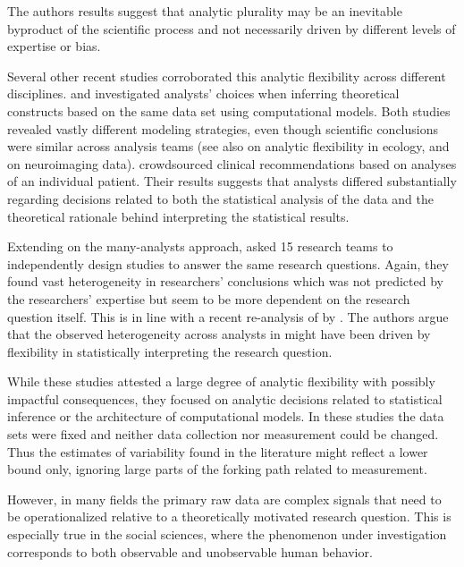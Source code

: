 \documentclass[Review,times,sageh]{sagej}
\begin{document}
The authors results suggest that analytic plurality may be an inevitable byproduct of the scientific process and not necessarily driven by different levels of expertise or bias.

Several other recent studies corroborated this analytic flexibility across different disciplines.
\citet{dutilh2019} and \citet{starns2019assessing} investigated analysts' choices when inferring theoretical constructs based on the same data set using computational models.
Both studies revealed vastly different modeling strategies, even though scientific conclusions were similar across analysis teams (see also \citet{Parker2020} on analytic flexibility in ecology, and \citet{botvinik-nezer2020} on neuroimaging data).
\citet{bastiaansen2020} crowdsourced clinical recommendations based on analyses of an individual patient.
Their results suggests that analysts differed substantially regarding decisions related to both the statistical analysis of the data and the theoretical rationale behind interpreting the statistical results.

Extending on the many-analysts approach, \citet{landy2020crowdsourcing} asked 15 research teams to independently design studies to answer the same research questions.
Again, they found vast heterogeneity in researchers' conclusions which was not predicted by the researchers' expertise but seem to be more dependent on the research question itself.
This is in line with a recent re-analysis of \citet{silberzahn2018many} by \citet{auspurg2021has}.
The authors argue that the observed heterogeneity across analysts in \citet{silberzahn2018many} might have been driven by flexibility in statistically interpreting the research question.

While these studies attested a large degree of analytic flexibility with possibly impactful consequences, they focused on analytic decisions related to statistical inference or the architecture of computational models.
In these studies the data sets were fixed and neither data collection nor measurement could be changed.
Thus the estimates of variability found in the literature might reflect a lower bound only, ignoring large parts of the forking path related to measurement.

However, in many fields the primary raw data are complex signals that need to be operationalized relative to a theoretically motivated research question.
This is especially true in the social sciences, where the phenomenon under investigation corresponds to both observable and unobservable human behavior.
\end{document}
